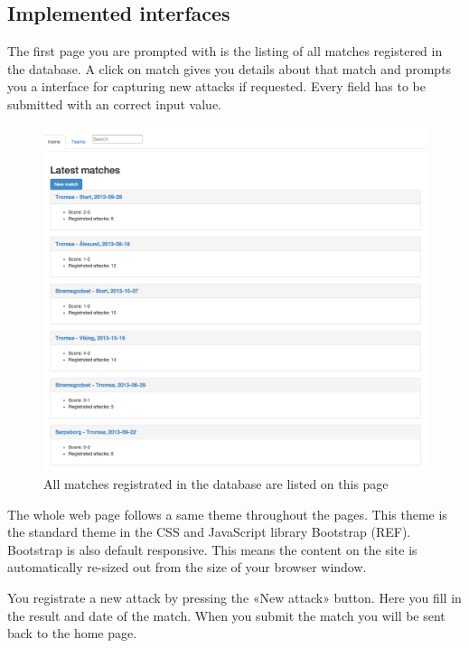 \subsection{Implemented interfaces}

The first page you are prompted with is the listing of all matches registered in the database. A click on match gives you details about that match and prompts you a interface for capturing new attacks if requested. Every field has to be submitted with an correct input value.

\begin{figure}[ht!]
\centering
\includegraphics[width=1\textwidth]{images/general/all_matches.png}
\caption{All matches registrated in the database are listed on this page}
\label{overflow}
\end{figure}


The whole web page follows a same theme throughout the pages. This theme is the standard theme in the CSS and JavaScript library Bootstrap (REF).  Bootstrap is also default responsive. This means the content on the site is automatically re-sized out from the size of your browser window.

You registrate a new attack by pressing the «New attack» button.  Here you fill in the result and date of the match.  When you submit the match you will be sent back to the home page. 

